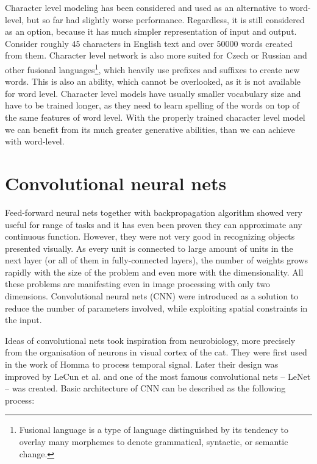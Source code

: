 Character level modeling has been considered and used as an alternative to word-level, but so far had slightly worse performance. Regardless, it is still considered as an option, because it has much simpler representation of input and output. Consider roughly $ 45 $ characters in English text and over $ 50 000 $ words created from them. Character level network is also more suited for Czech or Russian and other fusional languages\footnote{Fusional language is a type of language distinguished by its tendency to overlay many morphemes to denote grammatical, syntactic, or semantic change.}, which heavily use prefixes and suffixes to create new words. This is also an ability, which cannot be overlooked, as it is not available for word level.
Character level models have usually smaller vocabulary size and have to be trained longer, as they need to learn spelling of the words on top of the same features of word level. With the properly trained character level model we can benefit from its much greater generative abilities, than we can achieve with word-level.

	\section{Convolutional neural nets}
	
Feed-forward neural nets together with backpropagation algorithm showed very useful for range of tasks and it has even been proven \cite{cybenko:mcss,journals/nn/Hornik91} they can approximate any continuous function. However, they were not very good in recognizing objects presented visually. As every unit is connected to large amount of units in the next layer (or all of them in fully-connected layers), the number of weights grows rapidly with the size of the problem and even more with the dimensionality. All these problems are manifesting even in image processing with only two dimensions. Convolutional neural nets (CNN) were introduced as a solution to reduce the number of parameters involved, while exploiting spatial constraints in the input.

Ideas of convolutional nets took inspiration from neurobiology, more precisely from the organisation of neurons in visual cortex of the cat. They were first used in the work of Homma \cite{NIPS1987_20} to process temporal signal. Later their design was improved by LeCun et al. \cite{lecun-98} and one of the most famous convolutional nets -- LeNet -- was created. Basic architecture of CNN can be described as the following process:

